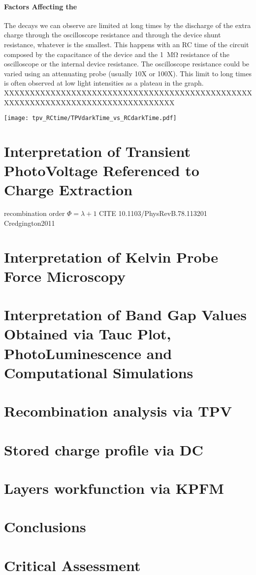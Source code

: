 \paragraph{Factors Affecting the }
The decays we can observe are limited at long times by the discharge of the extra charge through the oscilloscope resistance and through the device shunt resistance, whatever is the smallest. This happens with an RC time of the circuit composed by the capacitance of the device and the \SI{1}{\Mohm} resistance of the oscilloscope or the internal device resistance. The oscilloscope resistance could be varied using an attenuating probe (usually 10X or 100X). This limit to long times is often observed at low light intensities as a plateau in the  graph. XXXXXXXXXXXXXXXXXXXXXXXXXXXXXXXXXXXXXXXXXXXXXXXXXXXXXXXXXXXXXXXXXXXXXXXXXXXXXXXXX

\begin{SCfigure}
	\centering
	\texttt{[image: tpv\_RCtime/TPVdarkTime\_vs\_RCdarkTime.pdf]}
	\label{fig:tpv_RCtime}
\end{SCfigure}

\section{Interpretation of Transient PhotoVoltage Referenced to Charge Extraction}\label{interpretation_tpvce}

recombination order $\Phi = \lambda + 1$ CITE 10.1103/PhysRevB.78.113201 Credgington2011


\section{Interpretation of Kelvin Probe Force Microscopy}\label{interpretation_kpfm}

\section{Interpretation of Band Gap Values Obtained via Tauc Plot, PhotoLuminescence and Computational Simulations}\label{interpretation_bg}



\section{Recombination analysis via TPV}
\section{Stored charge profile via DC}
\section{Layers workfunction via KPFM}
\section{Conclusions}
\section{Critical Assessment}